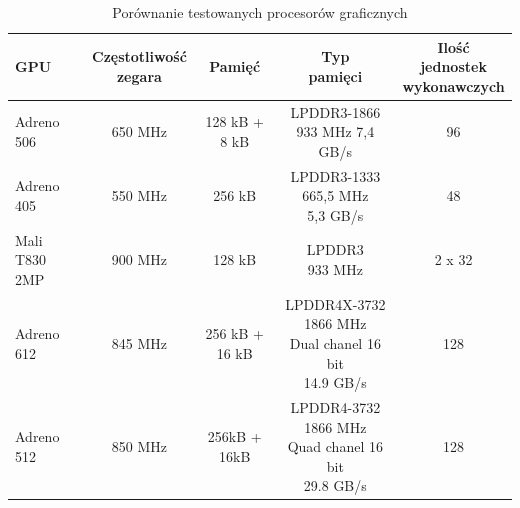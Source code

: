 \begin{table}[H]
    \caption{Porównanie testowanych procesorów graficznych}
    \label{tab:skale}
    \begin{tabular}{|l|c|c|c|c|}
\hline
\textbf{GPU} & \makecell{\textbf{Częstotliwość} \\ \textbf{zegara}} & \textbf{Pamięć} & \makecell{\textbf{Typ} \\ \textbf{pamięci}} & \makecell{\textbf{Ilość jednostek} \\ \textbf{wykonawczych}}\\
\hline
Adreno 506 & 650 MHz & 128 kB + 8 kB & \makecell{LPDDR3-1866 \\ 933 MHz 7,4 GB/s} & 96\\
\hline
Adreno 405 & 550 MHz & 256 kB & \makecell{LPDDR3-1333 665,5 MHz \\ 5,3 GB/s} & 48\\
\hline
Mali T830 2MP & 900 MHz & 128 kB & \makecell{LPDDR3 \\ 933 MHz} & 2 x 32\\
\hline
Adreno 612 & 845 MHz & 256 kB + 16 kB & \makecell{LPDDR4X-3732 1866 MHz \\ Dual chanel 16 bit \\ 14.9 GB/s} & 128\\
\hline
Adreno 512 & 850 MHz & 256kB + 16kB & \makecell{LPDDR4-3732 1866 MHz \\ Quad chanel 16 bit \\ 29.8 GB/s} & 128\\
\hline
\end{tabular}
\end{table}




